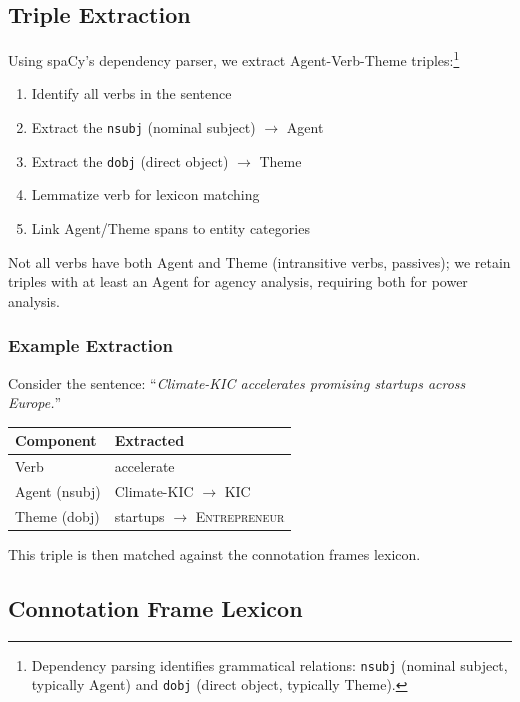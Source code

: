 \documentclass[../main.tex]{subfiles}
\begin{document}
\subsection{Triple Extraction}

Using spaCy's dependency parser, we extract Agent-Verb-Theme triples:\footnote{Dependency parsing identifies grammatical relations: \texttt{nsubj} (nominal subject, typically Agent) and \texttt{dobj} (direct object, typically Theme).}

\begin{enumerate}
    \item Identify all verbs in the sentence
    \item Extract the \texttt{nsubj} (nominal subject) $\rightarrow$ Agent
    \item Extract the \texttt{dobj} (direct object) $\rightarrow$ Theme
    \item Lemmatize verb for lexicon matching
    \item Link Agent/Theme spans to entity categories
\end{enumerate}

Not all verbs have both Agent and Theme (intransitive verbs, passives); we retain triples with at least an Agent for agency analysis, requiring both for power analysis.

\subsubsection{Example Extraction}

Consider the sentence: ``\textit{Climate-KIC accelerates promising startups across Europe.}''

\begin{center}
\small
\begin{tabular}{ll}
\toprule
\textbf{Component} & \textbf{Extracted} \\
\midrule
Verb & accelerate \\
Agent (nsubj) & Climate-KIC $\rightarrow$ \textsc{KIC} \\
Theme (dobj) & startups $\rightarrow$ \textsc{Entrepreneur} \\
\bottomrule
\end{tabular}
\end{center}

This triple is then matched against the connotation frames lexicon.

\subsection{Connotation Frame Lexicon}
\end{document}
